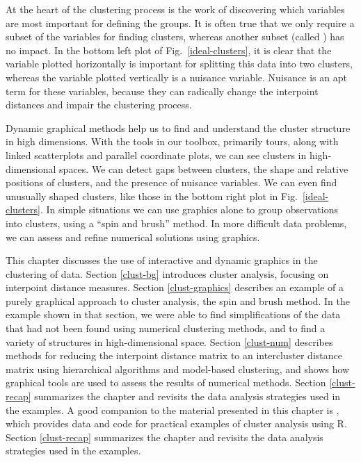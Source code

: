 At the heart of the clustering process is the work of discovering
which variables are most important for defining the groups.  It is
often true that we only require a subset of the variables for finding
clusters, whereas another subset (called ) has no
impact.  In the bottom left plot of Fig.~\ref{ideal-clusters}, it is
clear that the variable plotted horizontally is important for
splitting this data into two clusters, whereas the variable plotted
vertically is a nuisance variable. Nuisance is an apt term for these
variables, because they can radically change the interpoint distances
and impair the clustering process.

Dynamic graphical methods help us to find and understand the
cluster structure in high dimensions.  With the tools in our toolbox,
primarily tours, along with linked scatterplots and parallel
coordinate plots, we can see clusters in high-dimensional spaces. We
can detect gaps between clusters, the shape and relative positions of
clusters, and the presence of nuisance variables.  We can even find
unusually shaped clusters, like those in the bottom right plot in
Fig.~\ref{ideal-clusters}.  In simple situations we can use graphics
alone to group observations into clusters, using a ``spin and brush''
method. In more difficult data problems, we can assess and refine
numerical solutions using graphics.

This chapter discusses the use of interactive and dynamic graphics in
the clustering of data.  Section \ref{clust-bg} introduces cluster
analysis, focusing on interpoint distance measures. Section
\ref{clust-graphics} describes an example of a purely graphical
approach to cluster analysis, the spin and brush method. In the
example shown in that section, we were able to find simplifications of
the data that had not been found using numerical clustering methods,
and to find a variety of structures in high-dimensional space. Section
\ref{clust-num} describes methods for {reducing} the interpoint distance
matrix to an intercluster distance matrix using hierarchical
algorithms and model-based clustering, and shows how graphical tools
are used to assess the results of numerical methods. Section
\ref{clust-recap} summarizes the chapter and revisits the data
analysis strategies used in the examples. A good companion to the
material presented in this chapter is , which provides
data and code for practical examples of cluster analysis using R.
Section \ref{clust-recap} summarizes the chapter and revisits the data
analysis strategies used in the examples.

